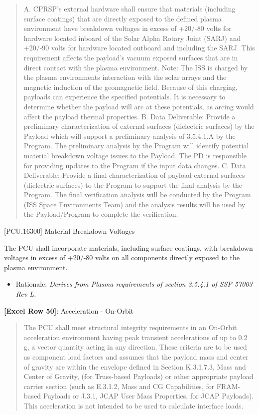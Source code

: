 \begin{quote}
A. CPRSP's external hardware shall ensure that materials (including surface coatings) that are directly exposed to the defined plasma environment have breakdown voltages in excess of +20\slash -80 volts for hardware located inboard of the Solar Alpha Rotary Joint (SARJ) and +20\slash -90 volts for hardware located outboard and including the SARJ. This requirement affects the payload’s vacuum exposed surfaces that are in direct contact with
the plasma environment.
Note: The ISS is charged by the plasma environments interaction with the solar arrays and the magnetic induction of the geomagnetic field. Because of this charging, payloads can experience the specified potentials. It is necessary to determine whether the payload will arc at these potentials, as arcing would affect the payload thermal properties.
B. Data Deliverable: Provide a preliminary characterization of external surfaces (dielectric surfaces) by the Payload which will support a preliminary analysis of 3.5.4.1.A by the Program. The preliminary analysis by the Program will identify potential material breakdown voltage issues to the Payload. The PD is responsible for providing updates to the Program if the input data changes.
C. Data Deliverable: Provide a final characterization of payload external surfaces (dielectric surfaces) to the Program to support the final analysis by the Program. The final verification analysis will be conducted by the Program (ISS Space Environments Team) and the analysis results will be used by the Payload\slash Program to complete the verification.
\end{quote}

[PCU.16300] Material Breakdown Voltages

The PCU shall incorporate materials, including surface coatings, with breakdown voltages in excess of +20\slash -80 volts on all components directly exposed to the plasma environment.

\begin{itemize}
\item{} Rationale: \emph{Derives from Plasma requirements of section 3.5.4.1 of SSP 57003 Rev L.}

\end{itemize}

\textbf{[Excel Row 50]}: Acceleration - On-Orbit

\begin{quote}
The PCU shall meet structural integrity requirements in an On-Orbit acceleration environment having peak transient accelerations of up to 0.2 g, a vector quantity acting in any direction. These criteria are to be used as component load factors and assumes that the payload mass and center of gravity are within the envelope defined in Section K.3.1.7.3, Mass and Center of Gravity, (for Truss-based Payloads) or other appropriate payload carrier section (such as E.3.1.2, Mass and CG Capabilities, for FRAM-based Payloads or J.3.1, JCAP User Mass Properties, for JCAP Payloads). This acceleration is not intended to be used to calculate interface loads.
\end{quote}

